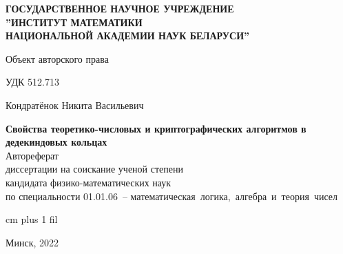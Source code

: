 \documentclass[_00_autoref.tex]{subfiles}
\begin{document}
\thispagestyle{empty}
\normalsize
\begin{center}
{\fontsize{16}{16}\selectfont \textbf{ГОСУДАРСТВЕННОЕ НАУЧНОЕ УЧРЕЖДЕНИЕ\\''ИНСТИТУТ МАТЕМАТИКИ\\НАЦИОНАЛЬНОЙ АКАДЕМИИ НАУК БЕЛАРУСИ''}}
\end{center}
\vspace{6ex}
\normalsize

\noindent Объект авторского права\par
\noindent УДК 512.713

\normalsize
\begin{center}
\vspace{6ex}
{\fontsize{16}{16}\selectfont Кондратёнок Никита Васильевич}
\end{center}
\vspace{0ex}
\begin{center}
\large
\textbf{Свойства теоретико-числовых и криптографических алгоритмов в дедекиндовых кольцах}\\
\vspace{4ex}
{\fontsize{15}{15}\selectfont Автореферат}\\
{\fontsize{15}{15}\selectfont диссертации на соискание ученой степени}\\
{\fontsize{15}{15}\selectfont кандидата физико-математических наук}\\
\vspace{2ex}
{\fontsize{15}{15}\selectfont по специальности 01.01.06~-- математическая~логика,~алгебра~и~теория~чисел}
\vspace{2ex}
\end{center}

 cm plus 1 fil
\begin{center}
Минск, 2022
\end{center}
\eject
\end{document}
